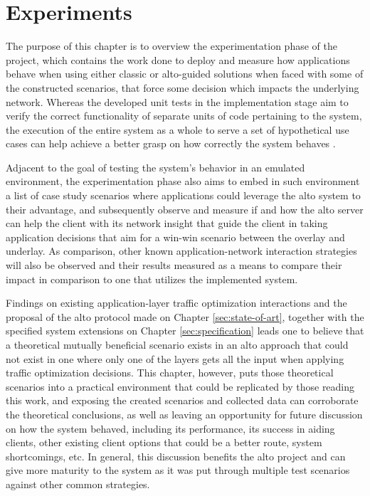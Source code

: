 \chapter{Experiments}

    The purpose of this chapter is to overview the experimentation phase of the project, which contains the work done to deploy and measure how applications behave when using either classic or \gls{alto}-guided solutions when faced with some of the constructed scenarios, that force some decision which impacts the underlying network.
    Whereas the developed unit tests in the implementation stage aim to verify the correct functionality of separate units of code pertaining to the system, the execution of the entire system as a whole to serve a set of hypothetical use cases can help achieve a better grasp on how correctly the system behaves .

    Adjacent to the goal of testing the system's behavior in an emulated environment, the experimentation phase also aims to embed in such environment a list of case study scenarios where applications could leverage the \gls{alto} system to their advantage, and subsequently observe and measure if and how the \gls{alto} server can help the client with its network insight that guide the client in taking application decisions that aim for a win-win scenario between the overlay and underlay.
    As comparison, other known application-network interaction strategies will also be observed and their results measured as a means to compare their impact in comparison to one that utilizes the implemented system.

    Findings on existing application-layer traffic optimization interactions and the proposal of the \gls{alto} protocol made on Chapter \ref{sec:state-of-art}, together with the specified system extensions on Chapter \ref{sec:specification} leads one to believe that a theoretical mutually beneficial scenario exists in an \gls{alto} approach that could not exist in one where only one of the layers gets all the input when applying traffic optimization decisions.
    This chapter, however, puts those theoretical scenarios into a practical environment that could be replicated by those reading this work, and exposing the created scenarios and collected data can corroborate the theoretical conclusions, as well as leaving an opportunity for future discussion on how the system behaved, including its performance, its success in aiding clients, other existing client options that could be a better route, system shortcomings, etc.
    In general, this discussion benefits the \gls{alto} project and can give more maturity to the system as it was put through multiple test scenarios against other common strategies.

